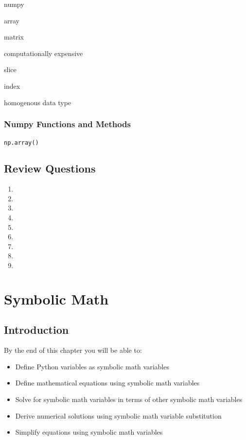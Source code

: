 \documentclass{book}
\begin{document}
numpy

array

matrix

computationally expensive

slice

index

homogenous data type

    \subsection{Numpy Functions and
Methods}\label{numpy-functions-and-methods}

\lstinline!np.array()!

    \section{Review Questions}\label{review-questions}

    \begin{enumerate}
\def\labelenumi{\arabic{enumi}.}
\item
\item
\item
\item
\item
\item
\item
\item
\item
\end{enumerate}

    \chapter{Symbolic Math}\label{symbolic-math}

    \section{Introduction}\label{introduction}

    By the end of this chapter you will be able to:

\begin{itemize}
\item
  Define Python variables as symbolic math variables
\item
  Define mathematical equations using symbolic math variables
\item
  Solve for symbolic math variables in terms of other symbolic math
  variables
\item
  Derive numerical solutions using symbolic math variable substitution
\item
  Simplify equations using symbolic math variables
\end{itemize}
\end{document}
